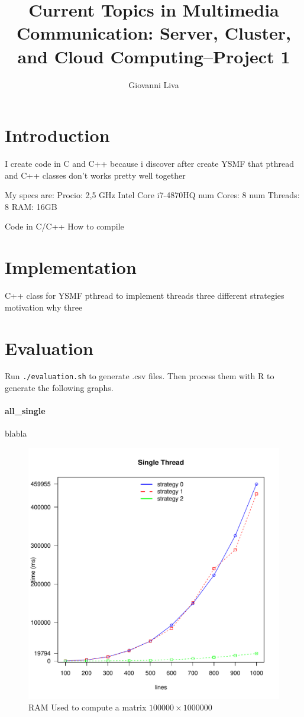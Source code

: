 \documentclass[]{article}
\title{Current Topics in Multimedia Communication: Server, Cluster, and Cloud Computing--Project 1}
\author{Giovanni Liva}
\begin{document}
\maketitle


\section*{Introduction}
I create code in C and C++ because i discover after create YSMF that pthread and C++ classes don't works pretty well together

My specs are:
Procio: 2,5 GHz Intel Core i7-4870HQ
num Cores: 8
num Threads: 8
RAM: 16GB

Code in C/C++
How to compile



\section*{Implementation}

C++ class for YSMF
pthread to implement threads
three different strategies
motivation why three 


\section*{Evaluation}

Run \texttt{./evaluation.sh} to generate .csv files.
Then process them with R to generate the following graphs.


\paragraph{all\_single}
blabla
\begin{figure}[H]
	\centering
	\includegraphics[width=1\textwidth]{img/all_single.pdf}
	\caption
	{RAM Used to compute a matrix $100000\times1000000$}
	\label{fig:all_single}
\end{figure}
\end{document}
